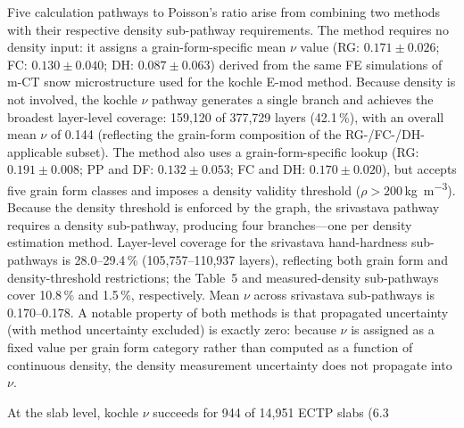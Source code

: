 \documentclass[hess, manuscript]{copernicus}
\begin{document}
Five calculation pathways to Poisson's ratio arise from combining two methods with their respective density sub-pathway requirements. The \citet{kochle2014} method requires no density input: it assigns a grain-form-specific mean $\nu$ value (RG: $0.171\pm0.026$; FC: $0.130\pm0.040$; DH: $0.087\pm0.063$) derived from the same FE simulations of m-CT snow microstructure used for the kochle E-mod method. Because density is not involved, the kochle $\nu$ pathway generates a single branch and achieves the broadest layer-level coverage: 159{,}120 of 377{,}729 layers (42.1\,\%), with an overall mean $\nu$ of 0.144 (reflecting the grain-form composition of the RG-/FC-/DH-applicable subset). The \citet{srivastava2016} method also uses a grain-form-specific lookup (RG: $0.191\pm0.008$; PP and DF: $0.132\pm0.053$; FC and DH: $0.170\pm0.020$), but accepts five grain form classes and imposes a density validity threshold ($\rho > 200$\,\si{kg.m^{-3}}). Because the density threshold is enforced by the graph, the srivastava pathway requires a density sub-pathway, producing four branches—one per density estimation method. Layer-level coverage for the srivastava hand-hardness sub-pathways is 28.0--29.4\,\% (105{,}757--110{,}937 layers), reflecting both grain form and density-threshold restrictions; the \citeauthor{kimjamieson2009} Table~5 and measured-density sub-pathways cover 10.8\,\% and 1.5\,\%, respectively. Mean $\nu$ across srivastava sub-pathways is 0.170--0.178. A notable property of both methods is that propagated uncertainty (with method uncertainty excluded) is exactly zero: because $\nu$ is assigned as a fixed value per grain form category rather than computed as a function of continuous density, the density measurement uncertainty does not propagate into $\nu$.


At the slab level, kochle $\nu$ succeeds for 944 of 14{,}951 ECTP slabs (6.3\,%
\end{document}
